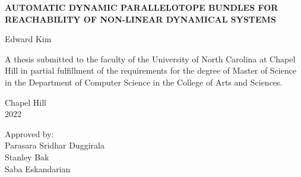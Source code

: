 \begin{titlepage}
\begin{center}


\vspace{2in}
\begin{singlespace}
\bf {\fontsize{12pt}{14.4pt}\selectfont \uppercase{Automatic Dynamic Parallelotope Bundles for Reachability of Non-linear Dynamical Systems}}
\end{singlespace}


\vspace{63pt} %
\large
Edward Kim
\end{center}



\vspace{40pt}
\begin{singlespace}
\noindent \fontsize{12pt}{14.4pt}\selectfont
\begin{center}
A thesis submitted to the faculty of the University of North Carolina at Chapel Hill
in partial fulfillment of the requirements for the degree of Master of Science in
the Department of Computer Science in the College of Arts and Sciences.
\end{center}
\end{singlespace}


\vspace{40pt}
\begin{center}
\begin{singlespace} \large
Chapel Hill\\
2022
\end{singlespace}
\end{center}


\vspace{40pt}
\begin{flushright}
\begin{minipage}[t]{2in} \large
Approved by:\\
Parasara Sridhar Duggirala \\
Stanley Bak \\
Saba Eskandarian \\
\end{minipage}
\end{flushright}

\end{titlepage}
